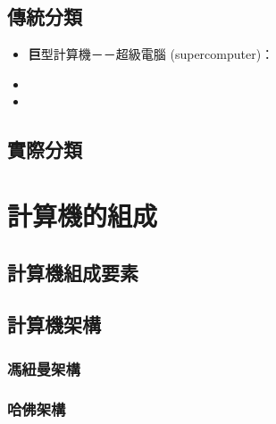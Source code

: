 \documentclass[12pt,a4paper,oneside]{report}
\begin{document}
\begin{CJK}{UTF8}{bkai}
\subsection{傳統分類}
\begin{itemize}
\item \textbf{巨}型計算機－－超級電腦 (supercomputer)：
\item
\item
\end{itemize}

\subsection{實際分類}

\section{計算機的組成}

\subsection{計算機組成要素}

\subsection{計算機架構}

\subsubsection{馮紐曼架構}

\subsubsection{哈佛架構}

\ifx \allfiles \undefined
\clearpage
\end{CJK}
\end{document}
